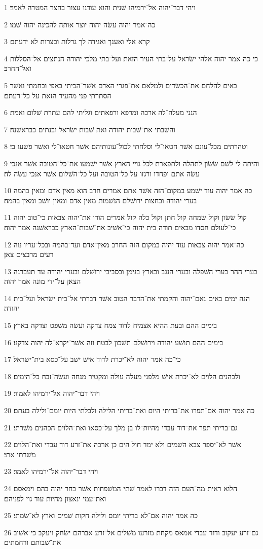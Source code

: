 \par 1 ויהי דבר־יהוה אל־ירמיהו שׁנית והוא עודנו עצור בחצר המטרה לאמר׃
\par 2 כה־אמר יהוה עשׂה יהוה יוצר אותה להכינה יהוה שׁמו׃
\par 3 קרא אלי ואענך ואגידה לך גדלות ובצרות לא ידעתם׃
\par 4 כי כה אמר יהוה אלהי ישׂראל על־בתי העיר הזאת ועל־בתי מלכי יהודה הנתצים אל־הסללות ואל־החרב׃
\par 5 באים להלחם את־הכשׂדים ולמלאם את־פגרי האדם אשׁר־הכיתי באפי ובחמתי ואשׁר הסתרתי פני מהעיר הזאת על כל־רעתם׃
\par 6 הנני מעלה־לה ארכה ומרפא ורפאתים וגליתי להם עתרת שׁלום ואמת׃
\par 7 והשׁבתי את־שׁבות יהודה ואת שׁבות ישׂראל ובנתים כבראשׁנה׃
\par 8 וטהרתים מכל־עונם אשׁר חטאו־לי וסלחתי לכול־עונותיהם אשׁר חטאו־לי ואשׁר פשׁעו בי׃
\par 9 והיתה לי לשׁם שׂשׂון לתהלה ולתפארת לכל גויי הארץ אשׁר ישׁמעו את־כל־הטובה אשׁר אנכי עשׂה אתם ופחדו ורגזו על כל־הטובה ועל כל־השׁלום אשׁר אנכי עשׂה לה׃
\par 10 כה אמר יהוה עוד ישׁמע במקום־הזה אשׁר אתם אמרים חרב הוא מאין אדם ומאין בהמה בערי יהודה ובחצות ירושׁלם הנשׁמות מאין אדם ומאין יושׁב ומאין בהמה׃
\par 11 קול שׂשׂון וקול שׂמחה קול חתן וקול כלה קול אמרים הודו את־יהוה צבאות כי־טוב יהוה כי־לעולם חסדו מבאים תודה בית יהוה כי־אשׁיב את־שׁבות־הארץ כבראשׁנה אמר יהוה׃
\par 12 כה־אמר יהוה צבאות עוד יהיה במקום הזה החרב מאין־אדם ועד־בהמה ובכל־עריו נוה רעים מרבצים צאן׃
\par 13 בערי ההר בערי השׁפלה ובערי הנגב ובארץ בנימן ובסביבי ירושׁלם ובערי יהודה עד תעברנה הצאן על־ידי מונה אמר יהוה׃
\par 14 הנה ימים באים נאם־יהוה והקמתי את־הדבר הטוב אשׁר דברתי אל־בית ישׂראל ועל־בית יהודה׃
\par 15 בימים ההם ובעת ההיא אצמיח לדוד צמח צדקה ועשׂה משׁפט וצדקה בארץ׃
\par 16 בימים ההם תושׁע יהודה וירושׁלם תשׁכון לבטח וזה אשׁר־יקרא־לה יהוה צדקנו׃
\par 17 כי־כה אמר יהוה לא־יכרת לדוד אישׁ ישׁב על־כסא בית־ישׂראל׃
\par 18 ולכהנים הלוים לא־יכרת אישׁ מלפני מעלה עולה ומקטיר מנחה ועשׂה־זבח כל־הימים׃
\par 19 ויהי דבר־יהוה אל־ירמיהו לאמור׃
\par 20 כה אמר יהוה אם־תפרו את־בריתי היום ואת־בריתי הלילה ולבלתי היות יומם־ולילה בעתם׃
\par 21 גם־בריתי תפר את־דוד עבדי מהיות־לו בן מלך על־כסאו ואת־הלוים הכהנים משׁרתי׃
\par 22 אשׁר לא־יספר צבא השׁמים ולא ימד חול הים כן ארבה את־זרע דוד עבדי ואת־הלוים משׁרתי אתי׃
\par 23 ויהי דבר־יהוה אל־ירמיהו לאמר׃
\par 24 הלוא ראית מה־העם הזה דברו לאמר שׁתי המשׁפחות אשׁר בחר יהוה בהם וימאסם ואת־עמי ינאצון מהיות עוד גוי לפניהם׃
\par 25 כה אמר יהוה אם־לא בריתי יומם ולילה חקות שׁמים וארץ לא־שׂמתי׃
\par 26 גם־זרע יעקוב ודוד עבדי אמאס מקחת מזרעו משׁלים אל־זרע אברהם ישׂחק ויעקב כי־אשׁוב את־שׁבותם ורחמתים׃

